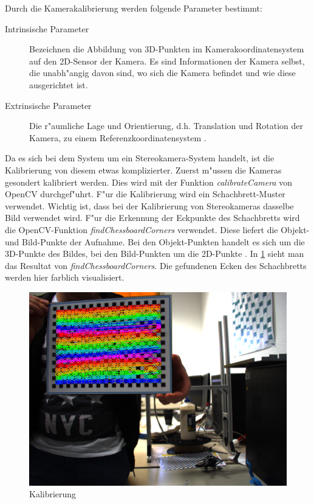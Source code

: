 \noindent Durch die Kamerakalibrierung werden folgende Parameter bestimmt:

\begin{description}
	\item[Intrinsische Parameter]
	Bezeichnen die Abbildung von 3D-Punkten im Kamerakoordinatensystem auf den 2D-Sensor der Kamera. Es sind Informationen der Kamera selbst, die unabh"angig davon sind, wo sich die Kamera befindet und wie diese ausgerichtet ist.
	
	\item[Extrinsische Parameter]
	Die r"aumliche Lage und Orientierung, d.h. Translation und Rotation der Kamera, zu einem Referenzkoordinatensystem \cite{cal} \cite{extr}.
\end{description}

\noindent Da es sich bei dem System um ein Stereokamera-System handelt, ist die Kalibrierung von diesem etwas komplizierter.\newline
Zuerst m"ussen die Kameras gesondert kalibriert werden. Dies wird mit der Funktion \textit{calibrateCamera} von OpenCV durchgef"uhrt. F"ur die Kalibrierung wird ein Schachbrett-Muster verwendet. Wichtig ist, dass bei der Kalibrierung von Stereokameras dasselbe Bild verwendet wird. F"ur die Erkennung der Eckpunkte des Schachbretts wird die OpenCV-Funktion \textit{findChessboardCorners} verwendet. Diese liefert die Objekt- und Bild-Punkte der Aufnahme. Bei den Objekt-Punkten handelt es sich um die 3D-Punkte des Bildes, bei den Bild-Punkten um die 2D-Punkte \cite{OcvD}. In \ref{fig:chessboards} sieht man das Resultat von \textit{findChessboardCorners}. Die gefundenen Ecken des Schachbretts werden hier farblich visualisiert.

\begin{figure}[H]
	\includegraphics[scale=0.4]{bilder/calibration}
	\caption[Kalibrierung]{Kalibrierung}
	\label{fig:chessboards}
\end{figure}

